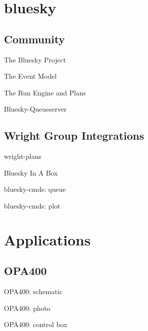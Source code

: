 \documentclass{presentation}
\begin{document}
\section{bluesky}
\subsection{Community}
\begin{frame}{The Bluesky Project}
\end{frame}
\begin{frame}{The Event Model}
\end{frame}
\begin{frame}{The Run Engine and Plans}
\end{frame}
\begin{frame}{Bluesky-Queueserver}
\end{frame}
\subsection{Wright Group Integrations}
\begin{frame}{wright-plans}
\end{frame}
\begin{frame}{Bluesky In A Box}
\end{frame}
\begin{frame}{bluesky-cmds: queue}
\end{frame}
\begin{frame}{bluesky-cmds: plot}
\end{frame}
\section{Applications}
\subsection{OPA400}
\begin{frame}{OPA400: schematic}
\end{frame}
\begin{frame}{OPA400: photo}
\end{frame}
\begin{frame}{OPA400: control box}
\end{frame}
\end{document}
